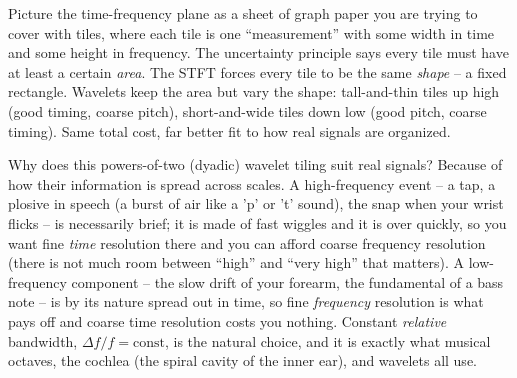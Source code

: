 \begin{intuitionbox}
Picture the time-frequency plane as a sheet of graph paper you are trying to
cover with tiles, where each tile is one ``measurement'' with some width in time
and some height in frequency. The uncertainty principle says every tile must have
at least a certain \emph{area}. The STFT forces every tile to be the same
\emph{shape} -- a fixed rectangle. Wavelets keep the area but vary the shape:
tall-and-thin tiles up high (good timing, coarse pitch), short-and-wide tiles
down low (good pitch, coarse timing). Same total cost, far better fit to how real
signals are organized.
\end{intuitionbox}

Why does this powers-of-two (dyadic) wavelet tiling suit real signals? Because of how their
information is spread across scales. A high-frequency event -- a tap, a
plosive in speech (a burst of air like a 'p' or 't' sound), the snap when your wrist flicks -- is necessarily brief; it is
made of fast wiggles and it is over quickly, so you want fine \emph{time}
resolution there and you can afford coarse frequency resolution (there is not
much room between ``high'' and ``very high'' that matters). A low-frequency
component -- the slow drift of your forearm, the fundamental of a bass note -- is
by its nature spread out in time, so fine \emph{frequency} resolution is what pays
off and coarse time resolution costs you nothing. Constant \emph{relative}
bandwidth, $\Delta f / f = \text{const}$, is the natural choice, and it is exactly
what musical octaves, the cochlea (the spiral cavity of the inner ear), and wavelets all use.

